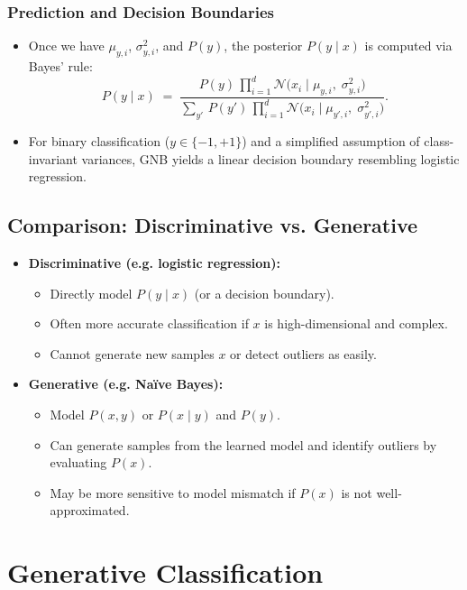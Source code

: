 \documentclass[twocolumn]{article}
\begin{document}
\begin{spacing}{1}
\subsubsection{Prediction and Decision Boundaries}
\begin{itemize}
    \item Once we have $\mu_{y,i}$, $\sigma_{y,i}^2$, and $P(y)$, the posterior $P(y \mid x)$ is computed via Bayes’ rule:
    \[
        P(y \mid x)
        \;=\;
        \frac{
            P(y)\,\prod_{i=1}^d
            \mathcal{N}\!\bigl(x_i \;\big|\;\mu_{y,i},\;\sigma_{y,i}^2\bigr)
        }{
            \sum_{y'}\,
            P(y')\,\prod_{i=1}^d
            \mathcal{N}\!\bigl(x_i \mid \mu_{y',i},\;\sigma_{y',i}^2\bigr)
        }.
    \]
    \item For binary classification ($y \in \{-1, +1\}$) and a simplified assumption of class-invariant variances, GNB yields a linear decision boundary resembling logistic regression.
\end{itemize}

\subsection{Comparison: Discriminative vs. Generative}
\begin{itemize}
    \item \textbf{Discriminative (e.g. logistic regression):} 
    \begin{itemize}
        \item Directly model $P(y \mid x)$ (or a decision boundary).
        \item Often more accurate classification if $x$ is high-dimensional and complex.
        \item Cannot generate new samples $x$ or detect outliers as easily.
    \end{itemize}
    \item \textbf{Generative (e.g. Na\"ive Bayes):} 
    \begin{itemize}
        \item Model $P(x,y)$ or $P(x \mid y)$ and $P(y)$.
        \item Can generate samples from the learned model and identify outliers by evaluating $P(x)$.
        \item May be more sensitive to model mismatch if $P(x)$ is not well-approximated.
    \end{itemize}
\end{itemize}

\section{Generative Classification}


\end{spacing}
\end{document}
